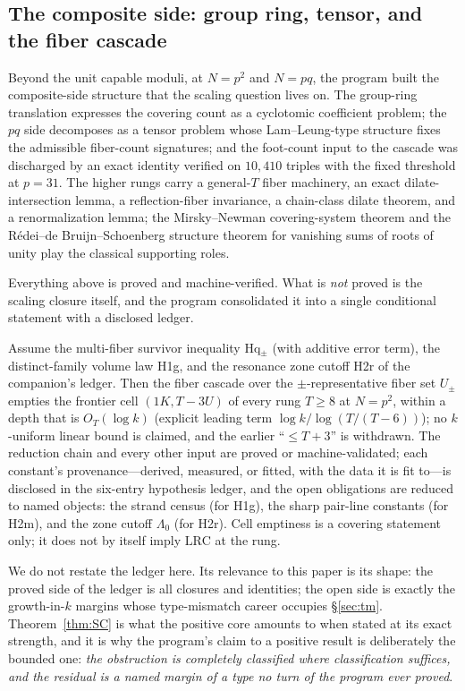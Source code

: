 \subsection{The composite side: group ring, tensor, and the fiber
cascade}

Beyond the unit capable moduli, at $N=p^2$ and $N=pq$, the program built
the composite-side structure that the scaling question lives on. The
group-ring translation expresses the covering count as a cyclotomic
coefficient problem; the $pq$ side decomposes as a tensor problem whose
Lam--Leung-type structure \cite{LamLeung} fixes the admissible
fiber-count signatures; and the foot-count input to the cascade was
discharged by an exact identity verified on $10{,}410$ triples with the
fixed threshold at $p=31$. The higher rungs carry a general-$T$ fiber
machinery, an exact dilate-intersection lemma, a reflection-fiber
invariance, a chain-class dilate theorem, and a renormalization lemma;
the Mirsky--Newman covering-system theorem and the
R\'edei--de Bruijn--Schoenberg structure theorem for vanishing sums of
roots of unity \cite{MirskyNewman,LamLeung} play the classical
supporting roles.

Everything above is proved and machine-verified. What is \emph{not}
proved is the scaling closure itself, and the program consolidated it
into a single conditional statement with a disclosed ledger.

\begin{theorem}\label{thm:SC}
Assume the multi-fiber survivor inequality Hq$_\pm$ (with additive error
term), the distinct-family volume law H1g, and the resonance zone cutoff
H2r of the companion's ledger. Then the fiber cascade over the
$\pm$-representative fiber set $U_\pm$ empties the frontier cell
$(1K,T{-}3U)$ of every rung $T\ge8$ at $N=p^2$, within a depth that is
$O_T(\log k)$ (explicit leading term $\log k/\log(T/(T-6))$); no
$k$-uniform linear bound is claimed, and the earlier ``$\le T+3$'' is
withdrawn. The reduction chain and every other input are proved or
machine-validated; each constant's provenance---derived, measured, or
fitted, with the data it is fit to---is disclosed in the six-entry
hypothesis ledger, and the open obligations are reduced to named objects:
the strand census (for H1g), the sharp pair-line constants (for H2m), and
the zone cutoff $\Lambda_0$ (for H2r). Cell emptiness is a covering
statement only; it does not by itself imply $\mathrm{LRC}$ at the rung.
\end{theorem}

We do not restate the ledger here. Its relevance to this paper is its
shape: the proved side of the ledger is all closures and identities; the
open side is exactly the growth-in-$k$ margins whose type-mismatch
career occupies \S\ref{sec:tm}. Theorem~\ref{thm:SC} is what the positive
core amounts to when stated at its exact strength, and it is why the
program's claim to a positive result is deliberately the bounded one:
\emph{the obstruction is completely classified where classification
suffices, and the residual is a named margin of a type no turn of the
program ever proved}.
